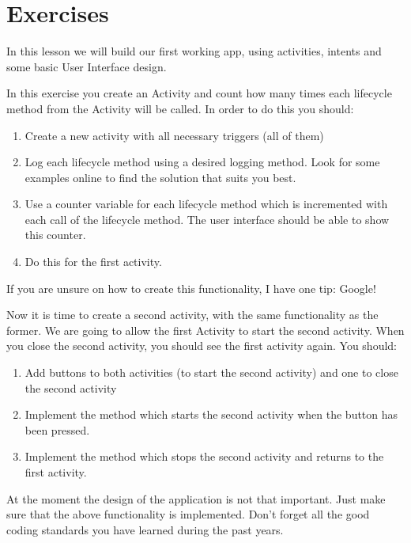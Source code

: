 \newpage
\section{Exercises}
In this lesson we will build our first working app, using activities, intents and some basic User Interface design.

\begin{exercise}
	In this exercise you create an Activity and count how many times each lifecycle method from the Activity will be called.
	In order to do this you should:
	\begin{enumerate}
		\item Create a new activity with all necessary triggers (all of them)
		\item Log each lifecycle method using a desired logging method.
			Look for some examples online to find the solution that suits you best.
		\item Use a counter variable for each lifecycle method which is incremented with each call of the lifecycle method.
			The user interface should be able to show this counter.
		\item Do this for the first activity.
	\end{enumerate}
	\label{ex:act1}
\end{exercise}

If you are unsure on how to create this functionality, I have one tip: Google!

\begin{exercise}
	Now it is time to create a second activity, with the same functionality as the former.
	We are going to allow the first Activity to start the second activity.
	When you close the second activity, you should see the first activity again.
	You should:
	\begin{enumerate}
		\item Add buttons to both activities (to start the second activity) and one to close the second activity
		\item Implement the method which starts the second activity when the button has been pressed.
		\item Implement the method which stops the second activity and returns to the first activity.
	\end{enumerate}
	\label{ex:act2}
\end{exercise}

At the moment the design of the application is not that important.
Just make sure that the above functionality is implemented.
Don't forget all the good coding standards you have learned during the past years.